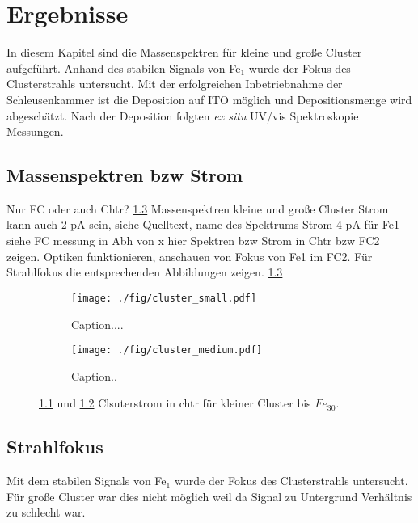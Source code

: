 \chapter{Ergebnisse}
In diesem Kapitel sind die Massenspektren für kleine und große Cluster aufgeführt.
Anhand des stabilen Signals von Fe$_1$ wurde der Fokus des Clusterstrahls untersucht.
Mit der erfolgreichen Inbetriebnahme der Schleusenkammer ist die Deposition auf ITO möglich und Depositionsmenge wird abgeschätzt.
Nach der Deposition folgten \textit{ex situ} UV/vis Spektroskopie Messungen.

\section{Massenspektren bzw Strom}
Nur FC oder auch Chtr? \ref{fig:cluster_chtr}
Massenspektren kleine und große Cluster
Strom kann auch 2 pA sein, siehe Quelltext, name des Spektrums %
Strom 4 pA für Fe1 siehe FC messung in Abh von x
hier Spektren bzw Strom in Chtr bzw FC2 zeigen. Optiken funktionieren, anschauen von Fokus von Fe1 im FC2.
Für Strahlfokus die entsprechenden Abbildungen zeigen.
\ref{fig:cluster_chtr}

\begin{figure}
    \begin{subfigure}[t]{0.475\textwidth}
      \texttt{[image: ./fig/cluster\_small.pdf]}
      \caption{Caption....}
      \label{fig:cluster_small}
    \end{subfigure}\hfill
    \begin{subfigure}[t]{0.475\textwidth}
      \texttt{[image: ./fig/cluster\_medium.pdf]}
      \caption{Caption..}
      \label{fig:cluster_medium}
    \end{subfigure}
    \caption{\ref{fig:cluster_small} und \ref{fig:cluster_medium} Clsuterstrom in chtr für kleiner Cluster bis $Fe_{30}$.} 
    \label{fig:cluster_chtr}
\end{figure}



\section{Strahlfokus}
Mit dem stabilen Signals von Fe$_1$ wurde der Fokus des Clusterstrahls untersucht.
Für große Cluster war dies nicht möglich weil da Signal zu Untergrund Verhältnis zu schlecht war.

